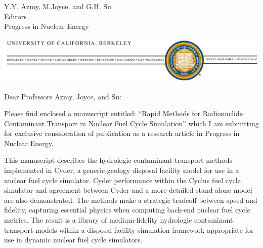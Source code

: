 \documentclass[10pt]{letter} %
\begin{document}

\begin{letter}{Y.Y. Azmy, M.Joyce, and G.H. Su\\
Editors\\
Progress in Nuclear Energy}


\begin{center}
\includegraphics[width=\textwidth]{bk_logo.eps}
\end{center}

\address{Department of Nuclear Engineering\\
4155 Etcheverry Hall\\
MC 1730\\
University of California, Berkeley\\
Berkeley, CA 94720-1730}



\opening{Dear Professors Azmy, Joyce, and Su:}

Please find enclosed a manuscript entitled: ``Rapid Methods for Radionuclide
Contaminant Transport in Nuclear Fuel Cycle Simulation'' which I am submitting
for exclusive consideration of publication as a research article in Progress in
Nuclear Energy.

This manuscript describes the hydrologic contaminant transport methods
implemented in Cyder, a generic-geology disposal facility model for use in a
nuclear fuel cycle simulator. Cyder performance within the Cyclus fuel cycle
simulator and agreement between Cyder and a more detailed stand-alone model are
also demonstrated. The methods make a strategic tradeoff between speed and
fidelity, capturing essential physics when computing back-end nuclear fuel
cycle metrics. The result is a library of medium-fidelity hydrologic
contaminant transport models within a disposal facility simulation framework
appropriate for use in dynamic nuclear fuel cycle simulators.


\end{letter}
\end{document}
